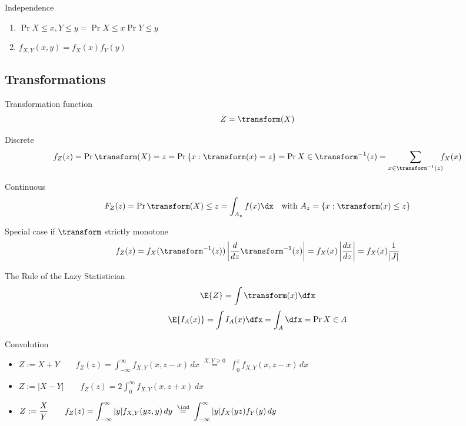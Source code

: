 \documentclass[landscape]{article}
\begin{document}
\begin{multicols*}{2}
Independence
\begin{enumerate}
  \item $\Pr{X \le x, Y \le y} = \Pr{X \le x}\Pr{Y \le y}$
  \item $f_{X,Y}(x,y) = f_X(x)f_Y(y)$
\end{enumerate}

\subsection{Transformations}

Transformation function
\[Z = \transform(X)\]

Discrete
\[f_Z(z) = \Pr{\transform(X) = z} = \Pr{\{x:\transform(x) = z\}}
= \Pr{X \in \transform^{-1}(z)} = \sum_{x \in \transform^{-1}(z)} \!\!\!f_X(x)\]

Continuous
\[F_Z(z) = \Pr{\transform(X) \le z} = \int_{A_z} f(x) \dx \quad
    \text{with } A_z = \{x:\transform(x) \le z\}\]

Special case if $\transform$ strictly monotone
\[f_Z(z)
    = f_X(\transform^{-1}(z))
      \left|\frac{d}{dz}\transform^{-1}(z)\right|
    = f_X(x)\left|\frac{dx}{dz}\right|
    = f_X(x)\frac{1}{|J|}\]

The Rule of the Lazy Statistician
\[\E{Z} = \int \transform(x) \dfx\]
\[\E{I_A(x)} = \int I_A(x) \dfx = \int_A \dfx = \Pr{X \in A}\]

Convolution
\begin{itemize}
  \item $ Z:=X+Y \qquad
    f_Z(z)=\displaystyle\int_{-\infty}^{\infty} f_{X,Y}(x,z-x)\,dx
    \;\stackrel{X,Y \ge 0}{=}\; \int_0^z f_{X,Y}(x,z-x)\,dx$
  \item $ Z:=|X-Y| \qquad
    f_Z(z)=\displaystyle2\int_0^\infty f_{X,Y}(x,z+x)\,dx$
  \item $ Z:=\displaystyle\frac{X}{Y} \qquad
    f_Z(z)=\displaystyle\int_{-\infty}^{\infty} |y| f_{X,Y}(yz,y)\,dy
    \;\stackrel{\ind}{=}\; \int_{-\infty}^{\infty} |y| f_X(yz)f_Y(y)\,dy$
\end{itemize}



\end{multicols*}
\end{document}
